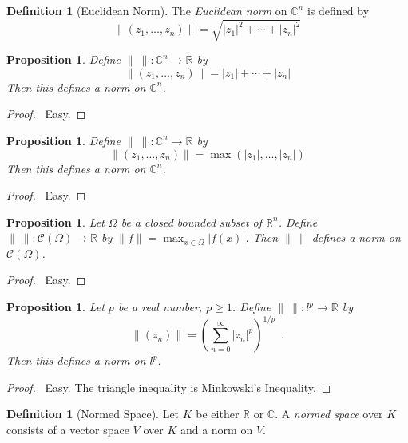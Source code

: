 \documentclass{book}
\let\qed\relax
\newtheorem{prop}[ax]{Proposition}
\theoremstyle{definition}
\newtheorem{df}[ax]{Definition}
\begin{document}
\begin{df}[Euclidean Norm]
The \emph{Euclidean norm} on $\mathbb{C}^n$ is defined by
\[ \| (z_1, \ldots, z_n) \| = \sqrt{|z_1|^2 + \cdots + |z_n|^2} \]
\end{df}

\begin{prop}
Define $\|\ \| : \mathbb{C}^n \rightarrow \mathbb{R}$ by
\[ \| (z_1, \ldots, z_n) \| = |z_1| + \cdots + |z_n| \]
Then this defines a norm on $\mathbb{C}^n$.
\end{prop}

\begin{proof}
\pf\ Easy. \qed
\end{proof}

\begin{prop}
Define $\|\ \| : \mathbb{C}^n \rightarrow \mathbb{R}$ by
\[ \| (z_1, \ldots, z_n) \| = \max(|z_1|, \ldots, |z_n|) \]
Then this defines a norm on $\mathbb{C}^n$.
\end{prop}

\begin{proof}
\pf\ Easy. \qed
\end{proof}

\begin{prop}
Let $\Omega$ be a closed bounded subset of $\mathbb{R}^n$. Define $\|\ \| : \mathcal{C}(\Omega) \rightarrow \mathbb{R}$ by $\| f \| = \max_{x \in \Omega} |f(x)|$. Then $\|\ \|$ defines a norm on $\mathcal{C}(\Omega)$.
\end{prop}

\begin{proof}
\pf\ Easy. \qed
\end{proof}

\begin{prop}
Let $p$ be a real number, $p \geq 1$. Define $\|\ \| : l^p \rightarrow \mathbb{R}$ by
\[ \| (z_n) \| = \left( \sum_{n=0}^\infty |z_n|^p \right)^{1/p} \enspace . \]
Then this defines a norm on $l^p$.
\end{prop}

\begin{proof}
\pf\ Easy. The triangle inequality is Minkowski's Inequality. \qed
\end{proof}

\begin{df}[Normed Space]
Let $K$ be either $\mathbb{R}$ or $\mathbb{C}$. A \emph{normed space} over $K$ consists of a vector space $V$ over $K$ and a norm on $V$.
\end{df}
\end{document}
